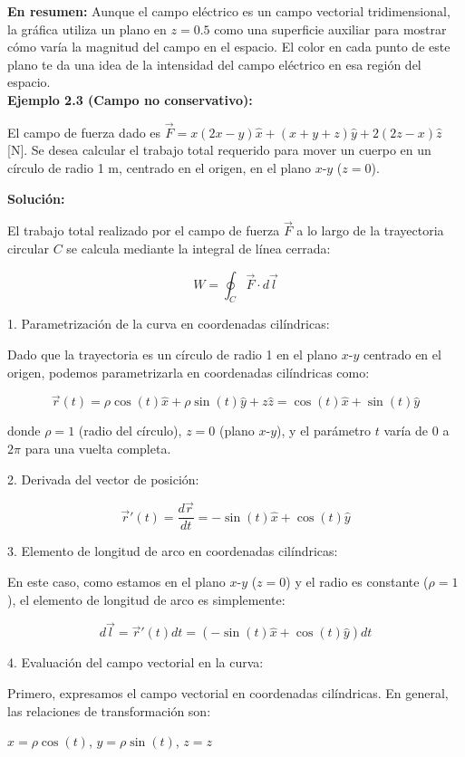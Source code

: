 \documentclass{article}
\begin{document}
\textbf{En resumen:} Aunque el campo eléctrico es un campo vectorial tridimensional, la gráfica utiliza un plano en $z=0.5$ como una superficie auxiliar para mostrar cómo varía la magnitud del campo en el espacio. El color en cada punto de este plano te da una idea de la intensidad del campo eléctrico en esa región del espacio.\\

\textbf{Ejemplo 2.3 (Campo no conservativo):}

El campo de fuerza dado es $\vec{F} = x(2x-y)\hat{x} + (x+y+z)\hat{y} + 2(2z-x)\hat{z}$ [N]. Se desea calcular el trabajo total requerido para mover un cuerpo en un círculo de radio 1 m, centrado en el origen, en el plano $x$-$y$ ($z=0$).

\textbf{Solución:}

El trabajo total realizado por el campo de fuerza $\vec{F}$ a lo largo de la trayectoria circular $C$ se calcula mediante la integral de línea cerrada:

\[
W = \oint_C \vec{F} \cdot d\vec{l}
\]

1. Parametrización de la curva en coordenadas cilíndricas:

Dado que la trayectoria es un círculo de radio 1 en el plano $x$-$y$ centrado en el origen, podemos parametrizarla en coordenadas cilíndricas como:

\[
\vec{r}(t) = \rho \cos(t) \hat{x} + \rho \sin(t) \hat{y} + z \hat{z} = \cos(t)\hat{x} + \sin(t)\hat{y}
\]

donde $\rho = 1$ (radio del círculo), $z=0$ (plano $x$-$y$), y el parámetro $t$ varía de $0$ a $2\pi$ para una vuelta completa.

2. Derivada del vector de posición:

\[
\vec{r}'(t) = \frac{d\vec{r}}{dt} = -\sin(t)\hat{x} + \cos(t)\hat{y}
\]

3. Elemento de longitud de arco en coordenadas cilíndricas:

En este caso, como estamos en el plano $x$-$y$ ($z=0$) y el radio es constante ($\rho = 1$), el elemento de longitud de arco es simplemente:

\[
d\vec{l} = \vec{r}'(t) dt = (-\sin(t)\hat{x} + \cos(t)\hat{y}) dt
\]

4. Evaluación del campo vectorial en la curva:

Primero, expresamos el campo vectorial en coordenadas cilíndricas. En general, las relaciones de transformación son:

$x = \rho \cos(t)$,
$y = \rho \sin(t)$,
$z = z$
\end{document}
